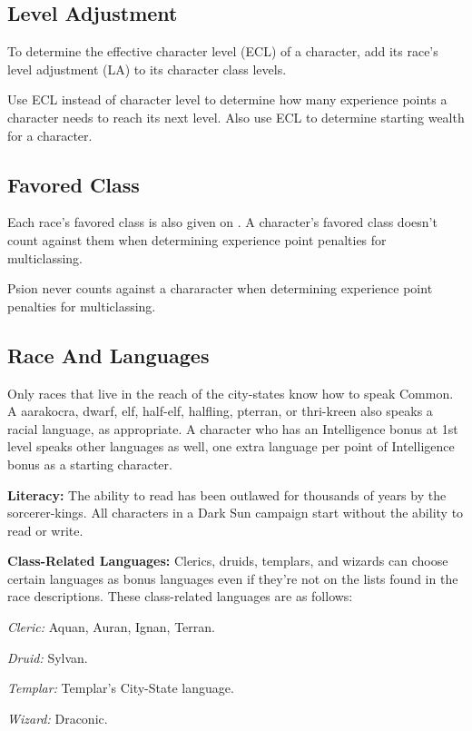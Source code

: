 \subsection{Level Adjustment}
To determine the effective character level (ECL) of a character, add its race's level adjustment (LA) to its character class levels.

Use ECL instead of character level to determine how many experience points a character needs to reach its next level. Also use ECL to determine starting wealth for a character.

\subsection{Favored Class}
Each race's favored class is also given on . A character's favored class doesn't count against them when determining experience point penalties for multiclassing.

Psion never counts against a chararacter when determining experience point penalties for multiclassing.

\subsection{Race And Languages}
Only races that live in the reach of the city-states know how to speak Common. A aarakocra, dwarf, elf, half-elf, halfling, pterran, or thri-kreen also speaks a racial language, as appropriate. A character who has an Intelligence bonus at 1st level speaks other languages as well, one extra language per point of Intelligence bonus as a starting character.

\textbf{Literacy:} The ability to read has been outlawed for thousands of years by the sorcerer-kings. All characters in a {\tableheader Dark Sun} campaign start without the ability to read or write.

\textbf{Class-Related Languages:} Clerics, druids, templars, and wizards can choose certain languages as bonus languages even if they're not on the lists found in the race descriptions. These class-related languages are as follows:

\textit{Cleric:} Aquan, Auran, Ignan, Terran.

\textit{Druid:} Sylvan.

\textit{Templar:} Templar's City-State language.

\textit{Wizard:} Draconic.


% 
\vskip4cm






% 


